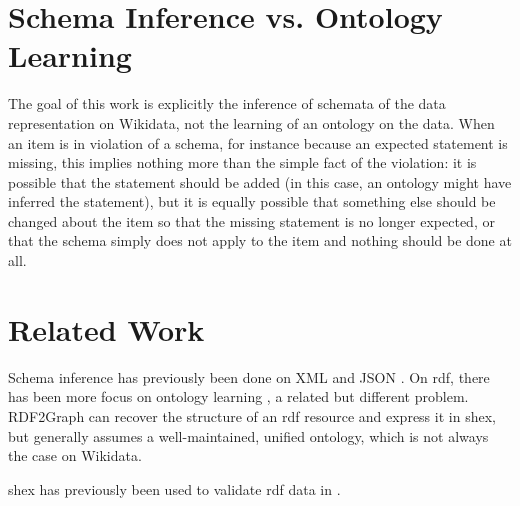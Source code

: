 \documentclass{scrartcl}
\begin{document}
\section{Schema Inference vs. Ontology Learning}

The goal of this work is explicitly the inference of schemata of the data representation on Wikidata,
not the learning of an ontology on the data.
When an item is in violation of a schema,
for instance because an expected statement is missing,
this implies nothing more than the simple fact of the violation:
it is possible that the statement should be added
(in this case, an ontology might have inferred the statement),
but it is equally possible that something else should be changed about the item so that the missing statement is no longer expected,
or that the schema simply does not apply to the item and nothing should be done at all.

\section{Related Work}

Schema inference has previously been done on XML \cite{Bex:2007:IXS:1325851.1325964} and JSON \cite{json-inference}.
On \gls{rdf}, there has been more focus on ontology learning \cite{Zhou2007}, a related but different problem.
RDF2Graph \cite{vanDam2015} can recover the structure of an \gls{rdf} resource and express it in \gls{shex},
but generally assumes a well-maintained, unified ontology,
which is not always the case on Wikidata.


\gls{shex} has previously been used to validate \gls{rdf} data in \cite{SOLBRIG201790}.



\end{document}
